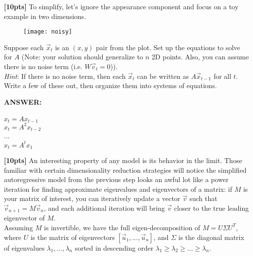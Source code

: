 \documentclass[paper=a4, fontsize=11pt]{scrartcl} %
\numberwithin{figure}{section} %
\numberwithin{table}{section} %
\begin{document}
\textbf{[10pts]} To simplify, let's ignore the appearance component and focus on a toy example in two dimensions. \\

\begin{wrapfigure}{l}{0.5\textwidth}
	\vspace{-3.5em}
	\begin{center}
		\texttt{[image: noisy]}
	\end{center}
	\vspace{-2.5em}
\end{wrapfigure}

Suppose each $\vec{x}_t$ is an $(x, y)$ pair from the plot. Set up the equations to solve for $A$ (Note: your solution should generalize to $n$ 2D points. Also, you can assume there is no noise term (i.e. $W\vec{v}_t = 0$)). \\

\emph{Hint}: If there is no noise term, then each $\vec{x}_t$ can be written as $A\vec{x}_{t - 1}$ for all $t$. Write a few of these out, then organize them into systems of equations. \\
\begin{addmargin}[2em]{2em}%
  \textbf{ANSWER:}\\\\
  ${x}_t = A{x}_{t-1}$\\
  ${x}_t = {A}^2{x}_{t-2}$\\
  ...\\
  ${x}_t = {A}^t{x}_1$
  \\
\end{addmargin}

\textbf{[10pts]} An interesting property of any model is its behavior in the limit. Those familiar with certain dimensionality reduction strategies will notice the simplified autoregressive model from the previous step looks an awful lot like a power iteration for finding approximate eigenvalues and eigenvectors of a matrix: if $M$ is your matrix of interest, you can iteratively update a vector $\vec{v}$ such that $\vec{v}_{n + 1} = M\vec{v}_n$, and each additional iteration will bring $\vec{v}$ closer to the true leading eigenvector of $M$. \\

Assuming $M$ is invertible, we have the full eigen-decomposition of $M = U \Sigma U^T$, where $U$ is the matrix of eigenvectors $\left[ \vec{u}_1, ..., \vec{u}_n \right]$, and $\Sigma$ is the diagonal matrix of eigenvalues $\lambda_1, ..., \lambda_n$ sorted in descending order $\lambda_1 \ge \lambda_2 \ge ... \ge \lambda_n$. \\
\end{document}

